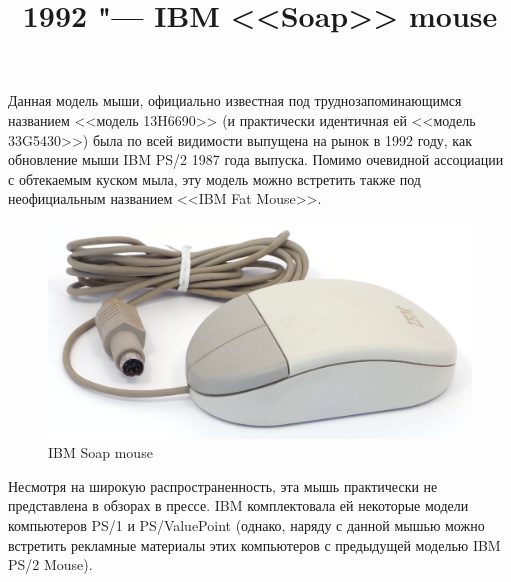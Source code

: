 \documentclass[11pt, a4paper]{article}
\begin{document}
\title{1992 "--- IBM <<Soap>> mouse}
\date{}
\maketitle
{}
Данная модель мыши, официально известная под труднозапоминающимся названием <<модель 13H6690>> (и практически идентичная ей <<модель 33G5430>>) была по всей видимости выпущена на рынок в 1992 году, как обновление мыши IBM PS/2 1987 года выпуска.
Помимо очевидной ассоциации с обтекаемым куском мыла, эту модель можно встретить также под неофициальным названием <<IBM Fat Mouse>>.

\begin{figure}[h]
    \centering
    \includegraphics[scale=0.6]{1992_ibm_soap_mouse/pic_30.jpg}
    \caption{IBM Soap mouse}
    \label{fig:IBMSoapPic}
\end{figure}

Несмотря на широкую распространенность, эта мышь практически не представлена в обзорах в прессе. IBM комплектовала ей некоторые модели компьютеров PS/1 и PS/ValuePoint (однако, наряду с данной мышью можно встретить рекламные материалы этих компьютеров с предыдущей моделью IBM PS/2 Mouse).
\end{document}
